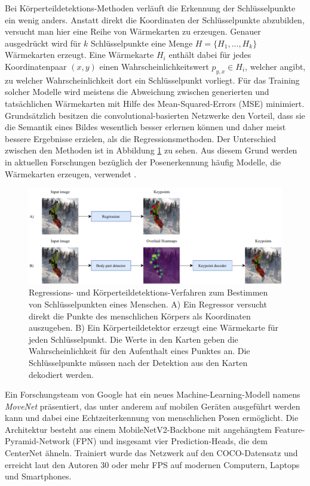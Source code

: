 Bei Körperteildetektions-Methoden verläuft die Erkennung der Schlüsselpunkte ein
wenig anders. Anstatt direkt die Koordinaten der Schlüsselpunkte abzubilden,
versucht man hier eine Reihe von Wärmekarten zu erzeugen. Genauer ausgedrückt
wird für $k$ Schlüsselpunkte eine Menge $H = \{H_1, ..., H_k\}$ Wärmekarten
erzeugt. Eine Wärmekarte $H_i$ enthält dabei für jedes Koordinatenpaar $(x, y)$
einen Wahrscheinlichkeitswert $p_{y, x} \in H_i$, welcher angibt, zu welcher
Wahrscheinlichkeit dort ein Schlüsselpunkt vorliegt. Für das Training solcher
Modelle wird meistens die Abweichung zwischen generierten und tatsächlichen
Wärmekarten mit Hilfe des Mean-Squared-Errors (MSE) minimiert. Grund\-sätz\-lich
besitzen die convolutional-basierten Netzwerke den Vorteil, dass sie die
Semantik eines Bildes wesentlich besser erlernen können und daher meist bessere
Ergebnisse erzielen, als die Regressionsmethoden. Der Unterschied zwischen den
Methoden ist in Abbildung \ref{fig:pose-detection} zu sehen. Aus diesem Grund
werden in aktuellen Forschungen bezüglich der Posenerkennung häufig Modelle, die
Wärmekarten erzeugen, verwendet \cite{zheng2021deep}.

\begin{figure}
    \includegraphics[width=\textwidth]{images/pose_detection.pdf}
    \caption{Regressions- und Körperteildetektions-Verfahren
    zum Bestimmen von Schlüsselpunkten eines Menschen. A) Ein Regressor
    versucht direkt die Punkte des menschlichen Körpers als Koordinaten
    auszugeben. B) Ein Körperteildetektor erzeugt eine Wärmekarte für jeden
    Schlüsselpunkt. Die Werte in den Karten geben die Wahrscheinlichkeit für den
    Aufenthalt eines Punktes an. Die Schlüsselpunkte müssen nach der Detektion aus den Karten dekodiert werden.}
    \label{fig:pose-detection}
\end{figure}

Ein Forschungsteam von Google hat ein neues Machine-Learning-Modell namens
\textit{MoveNet} \cite{movenet} präsentiert, das unter anderem auf mobilen
Geräten ausgeführt werden kann und dabei eine Echtzeiterkennung von menschlichen
Posen ermöglicht. Die Architektur besteht aus einem MobileNetV2-Backbone mit
angehängtem Feature-Pyramid-Network (FPN) und insgesamt vier Prediction-Heads,
die dem CenterNet ähneln. Trainiert wurde das Netzwerk auf den COCO-Datensatz und erreicht laut den Autoren 30 oder mehr FPS auf modernen Computern, Laptops und Smartphones. 

